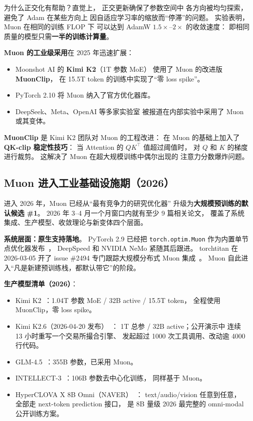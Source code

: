 为什么正交化有帮助？直觉上，
正交更新确保了参数空间中
各方向被均匀探索，避免了 Adam 在某些方向上
因自适应学习率的缩放而“停滞”的问题。
实验表明，Muon 在相同的训练 FLOP 下
可以达到 AdamW $1.5\times$--$2\times$ 的收敛速度：
即相同质量的模型只需\textbf{一半的训练计算量}。

\textbf{Muon 的工业级采用}在 2025 年迅速扩展：
\begin{itemize}[noitemsep]
  \item Moonshot AI 的 \textbf{Kimi K2}（1T 参数 MoE）
        使用了 Muon 的改进版 \textbf{MuonClip}，
        在 15.5T token 的训练中实现了“零 loss spike”。
  \item PyTorch 2.10 将 Muon 纳入了官方优化器库。
  \item DeepSeek、Meta、OpenAI 等多家实验室
        被报道在内部实验中采用了 Muon 或其变体。
\end{itemize}

\textbf{MuonClip} 是 Kimi K2 团队对 Muon 的工程改进：%
在 Muon 的基础上加入了\textbf{QK-clip 稳定性技巧}：
当 Attention 的 $QK^\top$ 值超过阈值时，
对 $Q$ 和 $K$ 的梯度进行裁剪。
这解决了 Muon 在超大规模训练中偶尔出现的
注意力分数爆炸问题。

\subsection{Muon 进入工业基础设施期（2026）}
\label{sec:muon-infra-2026}

进入 2026 年，Muon 已经从“最有竞争力的研究优化器”
升级为\textbf{大规模预训练的默认候选 \#1}。
2026 年 3--4 月一个月窗口内就有至少 9 篇相关论文，
覆盖了系统集成、生产模型、收敛理论与新变体四个层面。

\textbf{系统层面：原生支持落地}。
PyTorch 2.9 已经把 \texttt{torch.optim.Muon}
作为内置单节点优化器发布~\cite{torch_muon_2026}，
DeepSpeed 和 NVIDIA NeMo 紧随其后跟进。
torchtitan 在 2026-03-05 开了 issue \#2494
专门跟踪大规模分布式 Muon 集成~\cite{torchtitan_muon_issue}。
Muon 自此进入“凡是新建预训练栈，都默认带它”的阶段。

\textbf{生产模型清单（2026）}：
\begin{itemize}[noitemsep]
  \item Kimi K2~\cite{kimik2_2026}：1.04T 参数 MoE / 32B active / 15.5T token，
        全程使用 MuonClip，零 loss spike。
  \item Kimi K2.6（2026-04-20 发布）~\cite{kimik26_2026}：
        1T 总参 / 32B active；公开演示中
        连续 13 小时重写一个交易所撮合引擎、
        发起超过 1000 次工具调用、改动逾 4000 行代码。
  \item GLM-4.5~\cite{glm45_2026}：355B 参数，已采用 Muon。
  \item INTELLECT-3~\cite{intellect3_2026}：106B 参数去中心化训练，
        同样基于 Muon。
  \item HyperCLOVA X 8B Omni（NAVER）~\cite{hyperclova_x_omni_2026}：
        text/audio/vision 任意到任意，
        全部走 next-token prediction 接口，
        是 8B 量级 2026 最完整的 omni-modal 公开训练方案。
\end{itemize}

